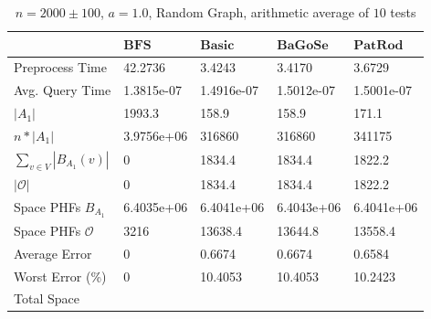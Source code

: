 \documentclass[shortabstract, lic, english]{iithesis}
\theoremstyle{definition} \newtheorem{definition}{Definition}[chapter]
\theoremstyle{remark} \newtheorem{remark}[definition]{Observation}
\theoremstyle{plain} \newtheorem{theorem}[definition]{Theorem}
\theoremstyle{plain} \newtheorem{lemma}[definition]{Lemma}
\theoremstyle{plain} \newtheorem{conjecture}[definition]{Conjecture}
\begin{document}
\begin{table}[H] \label{test:random.a10}
    \centering
    \begin{tabular}{ |p{3cm}||p{2cm}|p{2cm}|p{2cm}|p{2cm}|  } 
        \hline
        & $\mathbf{BFS}$ & $\mathbf{Basic}$ & $\mathbf{BaGoSe}$ & $\mathbf{PatRod}$ \\
        \hline
        \hline
        Preprocess Time                 & 42.2736    & 3.4243     & 3.4170      & 3.6729     \\
        \hline
        Avg. Query Time                 & 1.3815e-07 & 1.4916e-07 & 1.5012e-07  & 1.5001e-07 \\
        \hline
        $|A_1|$                         & 1993.3     & 158.9      & 158.9       & 171.1      \\
        \hline
        $n * |A_1|$                     & 3.9756e+06 & 316860     & 316860      & 341175     \\
        \hline
        $\sum_{v \in V} |B_{A_1}(v)| $  & 0          & 1834.4     & 1834.4      & 1822.2     \\
        \hline
        $|\mathcal{O}|$                 & 0          & 1834.4     & 1834.4      & 1822.2     \\
        \hline
        Space PHFs $B_{A_1}$            & 6.4035e+06 & 6.4041e+06 & 6.4043e+06  & 6.4041e+06 \\
        \hline
        Space PHFs $\mathcal{O}$        & 3216       & 13638.4    & 13644.8     & 13558.4    \\
        \hline
        Average Error                   & 0          & 0.6674     & 0.6674      & 0.6584     \\
        \hline
        Worst Error (\%)                & 0          & 10.4053    & 10.4053     & 10.2423    \\
        \hline
        Total Space                     &            &            &             &            \\
        \hline

    \end{tabular}
    \caption{$n = 2000 \pm 100$, $a = 1.0$, Random Graph, arithmetic average of $10$ tests}
\end{table}
\end{document}
